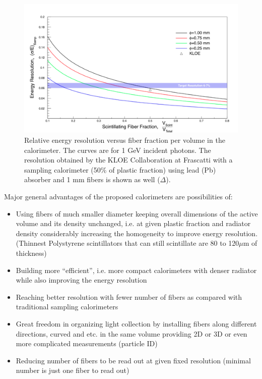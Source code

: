 \begin{figure}[h]
\centering
\includegraphics[width=0.95\linewidth]{images/Fig11_RelNrg.png}
\caption{Relative energy resolution versus fiber fraction per volume in the calorimeter. The curves are for 1 GeV incident photons. The resolution obtained by the KLOE Collaboration \cite{Antonelli1995} at Frascatti with a sampling calorimeter (50\% of plastic fraction) using lead (Pb) absorber and 1 mm fibers is shown as well ($\Delta$).}
\label{fig:RelNrg}
\end{figure}

Major general advantages of the proposed calorimeters are possibilities of:

\begin{itemize}
    \item Using fibers of much smaller diameter keeping overall dimensions of the active volume and its density unchanged, i.e. at given plastic fraction and radiator density considerably increasing the homogeneity to improve energy resolution.  (Thinnest  Polystyrene scintillators that can still scintillate are 80 to 120$\mu$m of thickness)
    \item Building more “efficient”, i.e. more compact calorimeters with denser radiator while also improving the energy resolution
    \item Reaching better resolution with fewer number of fibers as compared with traditional sampling calorimeters
    \item Great freedom in organizing light collection by installing fibers along different directions, curved and etc. in the same volume providing  2D or 3D or even more complicated measurements (particle ID)
    \item Reducing number of fibers to be read out at given fixed resolution (minimal number is just one fiber to read out)
\end{itemize}